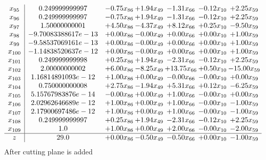 \documentclass[8pt]{article}
\begin{document}
\[\begin{array}{c| c c@{\hskip 2pt} c@{\hskip 2pt} c@{\hskip 2pt} c@{\hskip 2pt} c@{\hskip 2pt} }
 x_{95}   &  0.249999999997 & -0.75 x_{86} & +  1.94 x_{49} & -1.31 x_{66} & -0.12 x_{10} & +  2.25 x_{59}\\
 x_{96}   &  0.249999999997 & -0.75 x_{86} & +  1.94 x_{49} & -1.31 x_{66} & -0.12 x_{10} & +  2.25 x_{59}\\
 x_{97}   &  1.50000000001 & +  4.50 x_{86} & -4.37 x_{49} & +  8.12 x_{66} & +  0.25 x_{10} & -9.50 x_{59}\\
 x_{98}   &  -9.70083388617e-13 & +  0.00 x_{86} & -0.00 x_{49} & +  0.00 x_{66} & +  0.00 x_{10} & +  1.00 x_{59}\\
 x_{99}   &  -9.58537069161e-13 & +  0.00 x_{86} & -0.00 x_{49} & +  0.00 x_{66} & +  0.00 x_{10} & +  1.00 x_{59}\\
 x_{100}   &  -1.14838520637e-12 & +  0.00 x_{86} & -0.00 x_{49} & +  0.00 x_{66} & +  0.00 x_{10} & +  1.00 x_{59}\\
 x_{101}   &  0.249999999998 & +  0.25 x_{86} & +  1.94 x_{49} & -2.31 x_{66} & -0.12 x_{10} & +  2.25 x_{59}\\
 x_{102}   &  2.00000000002 & +  6.00 x_{86} & -8.25 x_{49} & + 13.75 x_{66} & +  0.50 x_{10} & -15.00 x_{59}\\
 x_{103}   &  1.16814891093e-12 & +  1.00 x_{86} & +  0.00 x_{49} & -0.00 x_{66} & -0.00 x_{10} & +  0.00 x_{59}\\
 x_{104}   &  0.750000000008 & +  2.75 x_{86} & -1.94 x_{49} & +  5.31 x_{66} & +  0.12 x_{10} & -6.25 x_{59}\\
 x_{105}   &  5.15767983876e-14 & -0.00 x_{86} & +  0.00 x_{49} & +  1.00 x_{66} & -0.00 x_{10} & +  0.00 x_{59}\\
 x_{106}   &  2.02962646689e-12 & +  1.00 x_{86} & +  0.00 x_{49} & +  1.00 x_{66} & -0.00 x_{10} & -1.00 x_{59}\\
 x_{107}   &  2.17900697486e-12 & +  1.00 x_{86} & +  0.00 x_{49} & +  1.00 x_{66} & -0.00 x_{10} & -1.00 x_{59}\\
 x_{108}   &  0.249999999997 & +  0.25 x_{86} & +  1.94 x_{49} & -2.31 x_{66} & -0.12 x_{10} & +  2.25 x_{59}\\
 x_{109}   &  1.0 & +  1.00 x_{86} & +  0.00 x_{49} & +  2.00 x_{66} & -0.00 x_{10} & -2.00 x_{59}\\
\hline
z    &  29.0 & +  0.00 x_{86} & -0.50 x_{49} & -0.50 x_{66} & +  0.00 x_{10} & -1.00 x_{59}\\
\end{array}\]
 After cutting plane is added 
\end{document}
